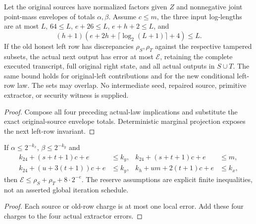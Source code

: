 \begin{theorem}
  \label{thm:lowerbounds-algebraic-affine-round-extraction}
  \leanok
  Let the original sources have normalized factors given $Z$ and
  nonnegative joint point-mass envelopes of totals $\alpha,\beta$.
  Assume $c\le m$, the three input log-lengths are at most $L$, $64\le L$,
  $e+26\le L$, $e+h+2\le L$, and
  \[
    (h+1)(e+2h+\lceil\log_2(L+1)\rceil+4)\le L.
  \]
  If the old honest left row has discrepancies $\rho_S,\rho_T$ against
  the respective tampered subsets, the actual next output has error at
  most $\mathcal E$, retaining the complete executed transcript, full
  original right state, and all actual outputs in $S\cup T$.
  The same bound holds for original-left contributions and for the new
  conditional left-row law. The sets may overlap. No intermediate seed,
  repaired source, primitive extractor, or security witness is supplied.
\end{theorem}
\begin{proof}
  \leanok
  Compose all four preceding actual-law implications and substitute the
  exact original-source envelope totals. Deterministic marginal projection
  exposes the next left-row invariant.
\end{proof}

\begin{theorem}
  \label{thm:lowerbounds-algebraic-affine-round-dyadic}
  \leanok
  If $\alpha\le2^{-k_x}$, $\beta\le2^{-k_y}$ and
  \begin{align*}
    k_{24}+(s+t+1)c+e&\le k_y, &
    k_{24}+(s+t+1)c+e&\le m,\\
    k_{24}+(u+3(t+1))c+e&\le k_y, &
    k_h+um+2(t+1)c+e&\le k_x,
  \end{align*}
  then $\mathcal E\le\rho_S+\rho_T+8\cdot2^{-e}$.
  The reserve assumptions are explicit finite inequalities, not an
  asserted global iteration schedule.
\end{theorem}
\begin{proof}
  \leanok
  Each source or old-row charge is at most one local error. Add these
  four charges to the four actual extractor errors.
\end{proof}


